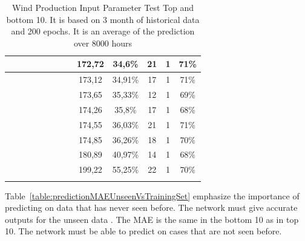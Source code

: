 \begin{center}
\begin{longtable}{|c|c|c|c|c|c|c|c|c|c|c|c|c|}
 \x &  &  \x &  \x &  &  \x &  \x &  & 172,72 & 34,6\% & 21 & 1 & 71\% \\ \hline
 \x &  &  &  &  \x &  \x &  \x &  & 173,12 & 34,91\% & 17 & 1 & 71\% \\ \hline
 \x &  &  \x &  \x &  &  \x &  \x &  \x & 173,65 & 35,33\% & 12 & 1 & 69\% \\ \hline
 \x &  \x &  \x &  \x &  \x &  \x &  \x &  \x & 174,26 & 35,8\% & 17 & 1 & 68\% \\ \hline
 \x &  \x &  &  \x &  &  \x &  \x &  \x & 174,55 & 36,03\% & 21 & 1 & 71\% \\ \hline
 \x &  &  &  \x &  &  \x &  \x &  \x & 174,85 & 36,26\% & 18 & 1 & 70\% \\ \hline
 \x &  \x &  \x &  &  \x &  \x &  \x &  & 180,89 & 40,97\% & 14 & 1 & 68\% \\ \hline
 \x &  \x &  &  &  \x &  \x &  \x &  \x & 199,22 & 55,25\% & 22 & 1 & 70\% \\ \hline
\caption{Wind Production Input Parameter Test Top and bottom 10. It is based on 3 month of historical data and 200 epochs. It is an average of the prediction over 8000 hours}
\label{table:windProdInputParamsTop10}
\end{longtable}
\end{center}
\normalsize

Table~\ref{table:predictionMAEUnseenVsTrainingSet} emphasize the importance of predicting on data that has never seen before. The network must give accurate outputs for the unseen data \cite{1}. The MAE is the same in the bottom 10 as in top 10. The network must be able to predict on cases that are not seen before.

